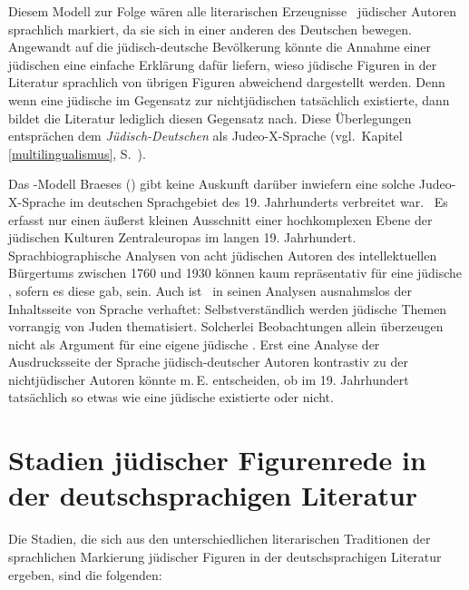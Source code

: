 Diesem Modell zur Folge wären alle literarischen Erzeugnisse \,%
jüdischer Autoren sprachlich markiert, da sie sich in einer anderen  des Deutschen bewegen. Angewandt auf die jüdisch-deutsche Bevölkerung könnte die Annahme einer jüdischen  eine einfache Erklärung dafür liefern, wieso  jüdische Figuren in der Literatur sprachlich von übrigen Figuren abweichend dargestellt werden. Denn wenn eine jüdische  im Gegensatz zur nichtjüdischen tatsächlich existierte, dann bildet die Literatur lediglich diesen Gegensatz nach. Diese Überlegungen entsprächen dem \textit{Jüdisch-Deutschen} als Judeo-X-Sprache (vgl.\, Kapitel \ref{multilingualismus}, S.\, \pageref{multilingualismus}). 

Das -Modell Braeses (\citeyear{Braese2010}) gibt keine Auskunft darüber  inwiefern eine solche Judeo-X-Sprache im deutschen Sprachgebiet des 19. Jahrhunderts verbreitet war.  \,%
Es erfasst nur einen äußerst kleinen Ausschnitt einer hochkomplexen Ebene der jüdischen Kulturen Zentraleuropas im langen 19. Jahrhundert. Sprachbiographische Analysen von acht jüdischen Autoren des intellektuellen Bürgertums zwischen 1760 und 1930 können kaum repräsentativ für eine jüdische , sofern es diese gab, sein. Auch ist \citeauthor{Braese2010} \,%
in seinen Analysen ausnahmslos der Inhaltsseite von Sprache verhaftet: Selbstverständlich werden jüdische Themen vorrangig von Juden thematisiert. Solcherlei Beobachtungen allein überzeugen nicht als Argument für eine eigene jüdische . Erst eine Analyse der Ausdrucksseite der Sprache jüdisch-deutscher Autoren kontrastiv zu der nichtjüdischer Autoren könnte m.\,E. entscheiden, ob im 19. Jahrhundert tatsächlich so etwas wie eine jüdische  existierte oder nicht. 

\section{Stadien jüdischer Figurenrede in der deutschsprachigen Literatur}\label{stadienkap}
                                                                         
Die Stadien, die sich aus den unterschiedlichen literarischen Traditionen der sprachlichen Markierung jüdischer Figuren in der deutschsprachigen Literatur ergeben, sind die folgenden: 

